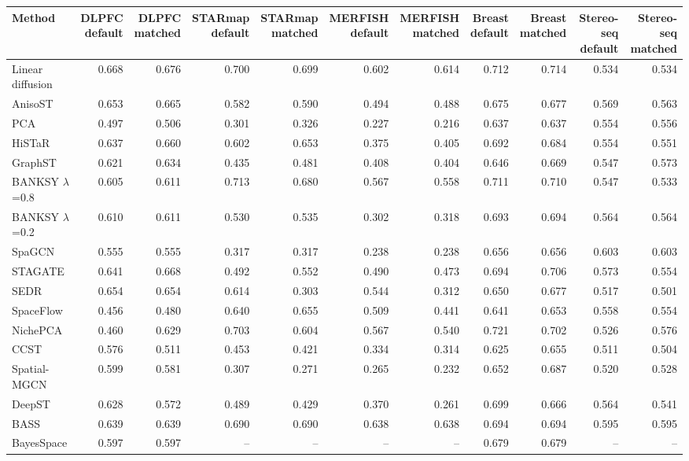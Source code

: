 \footnotesize
\begin{tabular}{lrrrrrrrrrr}
\toprule
Method & \shortstack{DLPFC\\default} & \shortstack{DLPFC\\matched} & \shortstack{STARmap\\default} & \shortstack{STARmap\\matched} & \shortstack{MERFISH\\default} & \shortstack{MERFISH\\matched} & \shortstack{Breast\\default} & \shortstack{Breast\\matched} & \shortstack{Stereo-seq\\default} & \shortstack{Stereo-seq\\matched} \\
\midrule
Linear diffusion & 0.668 & 0.676 & 0.700 & 0.699 & 0.602 & 0.614 & 0.712 & 0.714 & 0.534 & 0.534 \\
AnisoST & 0.653 & 0.665 & 0.582 & 0.590 & 0.494 & 0.488 & 0.675 & 0.677 & 0.569 & 0.563 \\
PCA & 0.497 & 0.506 & 0.301 & 0.326 & 0.227 & 0.216 & 0.637 & 0.637 & 0.554 & 0.556 \\
HiSTaR & 0.637 & 0.660 & 0.602 & 0.653 & 0.375 & 0.405 & 0.692 & 0.684 & 0.554 & 0.551 \\
GraphST & 0.621 & 0.634 & 0.435 & 0.481 & 0.408 & 0.404 & 0.646 & 0.669 & 0.547 & 0.573 \\
BANKSY $\lambda$=0.8 & 0.605 & 0.611 & 0.713 & 0.680 & 0.567 & 0.558 & 0.711 & 0.710 & 0.547 & 0.533 \\
BANKSY $\lambda$=0.2 & 0.610 & 0.611 & 0.530 & 0.535 & 0.302 & 0.318 & 0.693 & 0.694 & 0.564 & 0.564 \\
SpaGCN & 0.555 & 0.555 & 0.317 & 0.317 & 0.238 & 0.238 & 0.656 & 0.656 & 0.603 & 0.603 \\
STAGATE & 0.641 & 0.668 & 0.492 & 0.552 & 0.490 & 0.473 & 0.694 & 0.706 & 0.573 & 0.554 \\
SEDR & 0.654 & 0.654 & 0.614 & 0.303 & 0.544 & 0.312 & 0.650 & 0.677 & 0.517 & 0.501 \\
SpaceFlow & 0.456 & 0.480 & 0.640 & 0.655 & 0.509 & 0.441 & 0.641 & 0.653 & 0.558 & 0.554 \\
NichePCA & 0.460 & 0.629 & 0.703 & 0.604 & 0.567 & 0.540 & 0.721 & 0.702 & 0.526 & 0.576 \\
CCST & 0.576 & 0.511 & 0.453 & 0.421 & 0.334 & 0.314 & 0.625 & 0.655 & 0.511 & 0.504 \\
Spatial-MGCN & 0.599 & 0.581 & 0.307 & 0.271 & 0.265 & 0.232 & 0.652 & 0.687 & 0.520 & 0.528 \\
DeepST & 0.628 & 0.572 & 0.489 & 0.429 & 0.370 & 0.261 & 0.699 & 0.666 & 0.564 & 0.541 \\
BASS & 0.639 & 0.639 & 0.690 & 0.690 & 0.638 & 0.638 & 0.694 & 0.694 & 0.595 & 0.595 \\
BayesSpace & 0.597 & 0.597 & -- & -- & -- & -- & 0.679 & 0.679 & -- & -- \\
\bottomrule
\end{tabular}
